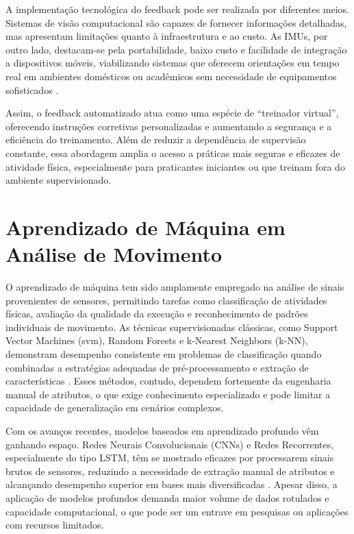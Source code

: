 A implementação tecnológica do feedback pode ser realizada por diferentes meios. Sistemas de visão computacional são capazes de fornecer informações detalhadas, mas apresentam limitações quanto à infraestrutura e ao custo. As IMUs, por outro lado, destacam-se pela portabilidade, baixo custo e facilidade de integração a dispositivos móveis, viabilizando sistemas que oferecem orientações em tempo real em ambientes domésticos ou acadêmicos sem necessidade de equipamentos sofisticados \cite{dzaja-quantitative-nodate,chen-analysis-2024,xia_volearn_2022}.  

Assim, o feedback automatizado atua como uma espécie de “treinador virtual”, oferecendo instruções corretivas personalizadas e aumentando a segurança e a eficiência do treinamento. Além de reduzir a dependência de supervisão constante, essa abordagem amplia o acesso a práticas mais seguras e eficazes de atividade física, especialmente para praticantes iniciantes ou que treinam fora do ambiente supervisionado.

\section{Aprendizado de Máquina em Análise de Movimento}

O aprendizado de máquina tem sido amplamente empregado na análise de sinais provenientes de sensores, permitindo tarefas como classificação de atividades físicas, avaliação da qualidade da execução e reconhecimento de padrões individuais de movimento. As técnicas supervisionadas clássicas, como Support Vector Machines (\gls{svm}), Random Forests e k-Nearest Neighbors (k-NN), demonstram desempenho consistente em problemas de classificação quando combinadas a estratégias adequadas de pré-processamento e extração de características \cite{gupta-yogahelp-2021,dzaja-quantitative-nodate}. Esses métodos, contudo, dependem fortemente da engenharia manual de atributos, o que exige conhecimento especializado e pode limitar a capacidade de generalização em cenários complexos.  

Com os avanços recentes, modelos baseados em aprendizado profundo vêm ganhando espaço. Redes Neurais Convolucionais (CNNs) e Redes Recorrentes, especialmente do tipo LSTM, têm se mostrado eficazes por processarem sinais brutos de sensores, reduzindo a necessidade de extração manual de atributos e alcançando desempenho superior em bases mais diversificadas \cite{dzaja-quantitative-nodate,xia_volearn_2022}. Apesar disso, a aplicação de modelos profundos demanda maior volume de dados rotulados e capacidade computacional, o que pode ser um entrave em pesquisas ou aplicações com recursos limitados.  

